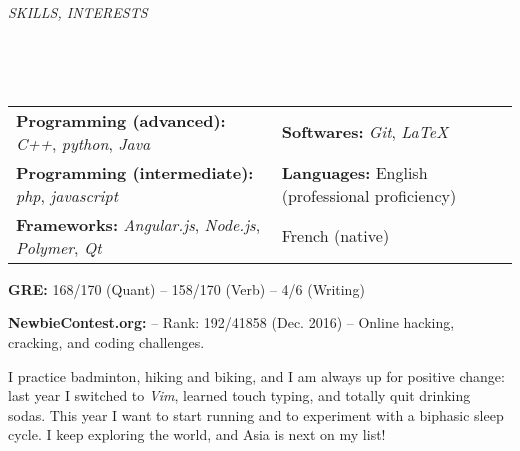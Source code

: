 \documentclass[a4paper, 12pt]{article}
\newcommand{\marginline}{-0.3cm}
\newcommand{\margincontent}{-0.6cm}
\newcommand{\marginbeforesection}{0.3cm}
\newcommand{\marginmisc}{0.15cm}
\newcommand{\marginbeforemisc}{-0.75cm}
\newcommand{\linewidthperso}{0.02cm}
\newcommand{\stylesection}[1]{
  \vspace{\marginbeforesection}
  \begin{normalsize}\textit{#1}\end{normalsize}
  \vspace{\marginline}\\
  \noindent\makebox[\linewidth]{\rule{\textwidth}{\linewidthperso}}

}
\begin{document}
\begin{footnotesize}
%

\stylesection{SKILLS, INTERESTS}
~\\
\vspace{\marginbeforemisc}

\noindent\begin{tabular}{@{}p{9cm}p{8cm}}
  \textbf{Programming (advanced):} \textit{C++}, \textit{python}, \textit{Java} & \textbf{Softwares:} \textit{Git}, \textit{LaTeX}\\
  \textbf{Programming (intermediate):} \textit{php}, \textit{javascript} & \textbf{Languages:} English (professional proficiency)\\
  \textbf{Frameworks:} \textit{Angular.js}, \textit{Node.js}, \textit{Polymer}, \textit{Qt} & \hspace{2cm} French (native)
\end{tabular}

\vspace{\marginmisc}
\textbf{GRE:} 168/170 (Quant) -- 158/170 (Verb) -- 4/6 (Writing)

\vspace{\marginmisc}
\textbf{NewbieContest.org:} -- Rank: 192/41858 (Dec. 2016) -- Online hacking, cracking, and coding challenges.

\vspace{\marginmisc}
I practice badminton, hiking and biking, and I am always up for positive change: last year I switched to \textit{Vim}, learned touch typing, and totally quit drinking sodas. This year I want to start running and to experiment with a biphasic sleep cycle. I keep exploring the world, and Asia is next on my list! 
  
\end{footnotesize}
\end{document}

